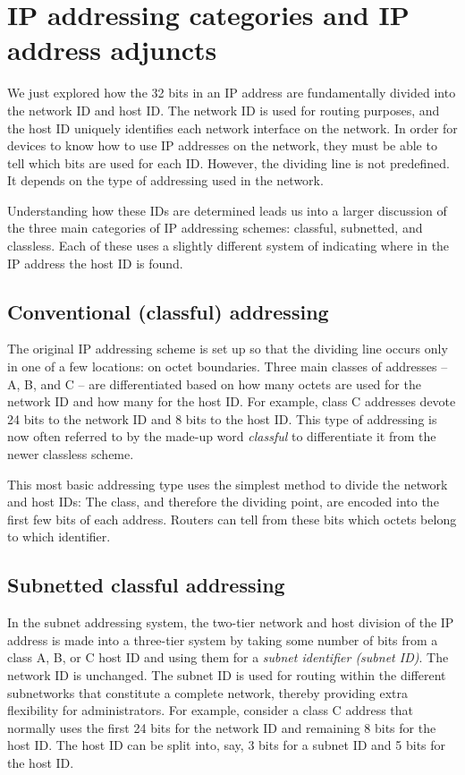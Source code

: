 \section{IP addressing categories and IP address adjuncts}

We just explored how the 32 bits in an IP address are fundamentally divided into
the network ID and host ID. The network ID is used for routing purposes,
and the host ID uniquely identifies each network interface on the
network. In order for devices to know how to use IP addresses on the
network, they must be able to tell which bits are used for each ID.
However, the dividing line is not predefined. It depends on the type of
addressing used in the network.

Understanding how these IDs are determined leads us into a larger
discussion of the three main categories of IP addressing schemes:
classful, subnetted, and classless. Each of these uses a slightly
different system of indicating where in the IP address the host ID is
found.



\subsection{Conventional (classful) addressing}

The original IP addressing scheme is set up so that the dividing line
occurs only in one of a few locations: on octet boundaries. Three main
classes of addresses -- A, B, and C -- are differentiated based on how
many octets are used for the network ID and how many for the host ID.
For example, class C addresses devote 24 bits to the network ID and 8
bits to the host ID. This type of addressing is now often referred to by
the made-up word \emph{classful} to differentiate it from the newer
classless scheme.

This most basic addressing type uses the simplest method to divide the
network and host IDs: The class, and therefore the dividing point, are
encoded into the first few bits of each address. Routers can tell from
these bits which octets belong to which identifier.




\subsection{Subnetted classful addressing}

In the subnet addressing system, the two-tier network and host division
of the IP address is made into a three-tier system by taking some number
of bits from a class A, B, or C host ID and using them for a
{\emph{subnet identifier (subnet ID)}}. The network ID is unchanged. The
subnet ID is used for routing within the different subnetworks that
constitute a complete network, thereby providing extra flexibility for
administrators. For example, consider a class C address that normally
uses the first 24 bits for the network ID and remaining 8 bits for the
host ID. The host ID can be split into, say, 3 bits for a subnet ID and
5 bits for the host ID.

